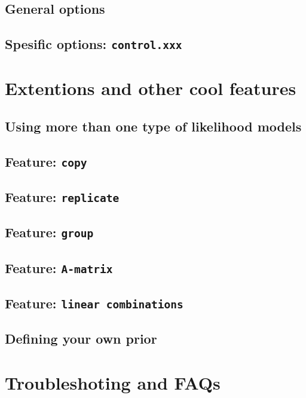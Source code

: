 \documentclass[a4paper,11pt]{report}
\newcommand{\tv}{\texttt}
\begin{document}
\section{General options}
\section{Spesific options: \tv{control.xxx}}



\chapter{Extentions and other cool features}

\section{Using more than one type of likelihood models}

\section{Feature: \tv{copy}}

\section{Feature: \tv{replicate}}

\section{Feature: \tv{group}}

\section{Feature: \tv{A-matrix}}

\section{Feature: \tv{linear combinations}}

\section{Defining your own prior}



\chapter{Troubleshoting and FAQs}
\end{document}
